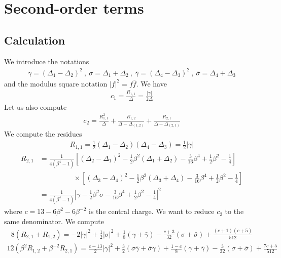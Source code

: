 \documentclass[12pt,a4paper]{article}
\begin{document}
\section{Second-order terms}

\subsection{Calculation}

We introduce the notations 
\begin{align}
 \gamma = (\Delta_1-\Delta_2)^2 \ , \ \sigma = \Delta_1+\Delta_2 \ , \ \bar\gamma = (\Delta_4-\Delta_3)^2 \ , \ \bar\sigma = \Delta_4+\Delta_3 
\end{align}
and the modulus square notation $|f|^2 = f\bar f$. 
We have 
\begin{align}
 c_1 = \frac{R_{1,1}}{\Delta} = \frac{|\gamma|}{2\Delta}
\end{align}
Let us also compute 
\begin{align}
 c_2 = \frac{R_{1,1}^2}{\Delta} +\frac{R_{1,2}}{\Delta-\Delta_{(1,2)}} + \frac{R_{2,1}}{\Delta-\Delta_{(2,1)}}
\end{align}
We compute the residues 
\begin{align}
 R_{1,1} = \tfrac12 (\Delta_1-\Delta_2)(\Delta_4-\Delta_3)  = \tfrac12 |\gamma| 
 \end{align}
 \begin{align}
   R_{2,1} &= \frac{1}{4(\beta^4-1)}\left[(\Delta_2-\Delta_1)^2 -\tfrac12 \beta^2(\Delta_1+\Delta_2) -\tfrac{3}{16}\beta^4+\tfrac12\beta^2-\tfrac14\right] 
   \\
 & \hspace{2cm} \times \left[(\Delta_3-\Delta_4)^2 -\tfrac12 \beta^2(\Delta_3+\Delta_4) -\tfrac{3}{16}\beta^4+\tfrac12\beta^2-\tfrac14\right] 
 \\
  &= \frac{1}{4(\beta^4-1)}\left|\gamma -\tfrac12 \beta^2 \sigma -\tfrac{3}{16}\beta^4+\tfrac12\beta^2-\tfrac14\right|^2 
 \end{align}
 where $c=13-6\beta^2-6\beta^{-2}$ is the central charge. 
We want to reduce $c_2$ to the same denominator. We compute 
\begin{align}
 8(R_{2,1}+R_{1,2})= -2 |\gamma|^2 +\tfrac{1}{2}|\sigma|^2
 +\tfrac{1}{8} (\gamma+\bar\gamma) -\tfrac{c+3}{32}(\sigma+\bar\sigma) + \tfrac{(c+1)(c+5)}{512}
\end{align}
\begin{align}
 12(\beta^2R_{1,2}+\beta^{-2}R_{2,1}) = \tfrac{c-13}{2}|\gamma|^2 +\tfrac32(\sigma\bar\gamma+\bar\sigma\gamma)+\tfrac{1-c}{8}(\gamma+\bar\gamma) -\tfrac{3}{32}(\sigma+\bar\sigma)+\tfrac{7c+5}{512}
\end{align}
\end{document}
